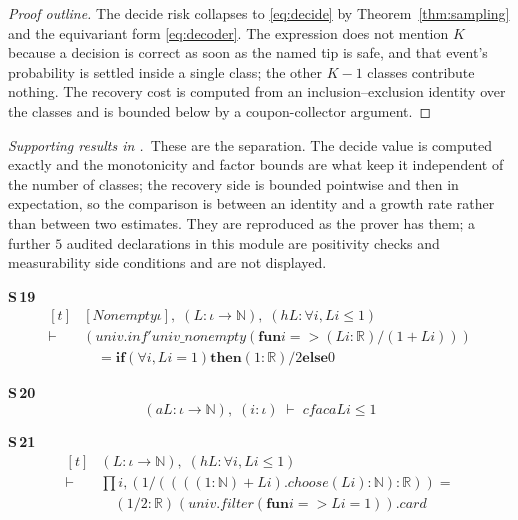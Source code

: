 \begin{proof}[Proof outline]
The decide risk collapses to \eqref{eq:decide} by Theorem~\ref{thm:sampling} and the
equivariant form \eqref{eq:decoder}. The expression does not mention $K$ because a decision is
correct as soon as the named tip is safe, and that event's probability is settled inside a
single class; the other $K-1$ classes contribute nothing. The recovery cost is computed from
an inclusion--exclusion identity over the classes and is bounded below by a coupon-collector
argument.
\end{proof}


\noindent\emph{Supporting results in .}~These are the separation. The decide value is computed exactly and the monotonicity and factor bounds are what keep it independent of the number of classes; the recovery side is bounded pointwise and then in expectation, so the comparison is between an identity and a growth rate rather than between two estimates. They are reproduced as the prover has them; a further $5$ audited declarations in this module are positivity checks and measurability side conditions and are not displayed.

\noindent\textbf{S\,19}\quad{}
{\footnotesize\[ \begin{aligned}[t]
&[\mathit{Nonempty} \iota ],\; (\mathit{L} : \iota \to \mathbb{N} ),\; (\mathit{hL} : \forall \mathit{i}, \mathit{L} \mathit{i} \leq 1)\\
\vdash\;&(\mathit{univ}.\mathit{inf'} \mathit{univ\_nonempty} (\mathbf{fun} \mathit{i} => (\mathit{L} \mathit{i} : \mathbb{R} ) / (1 + \mathit{L} \mathit{i})))\\
&\quad = \mathbf{if} (\forall \mathit{i}, \mathit{L} \mathit{i} = 1) \mathbf{then} (1 : \mathbb{R} ) / 2 \mathbf{else} 0
\end{aligned} \]}

\noindent\textbf{S\,20}\quad{}
{\footnotesize\[ (\mathit{a} \mathit{L} : \iota \to \mathbb{N} ),\; (\mathit{i} : \iota ) \;\vdash\; \mathit{cfac} \mathit{a} \mathit{L} \mathit{i} \leq 1 \]}

\noindent\textbf{S\,21}\quad{}
{\footnotesize\[ \begin{aligned}[t]
&(\mathit{L} : \iota \to \mathbb{N} ),\; (\mathit{hL} : \forall \mathit{i}, \mathit{L} \mathit{i} \leq 1)\\
\vdash\;&\textstyle\prod \mathit{i}, (1 / ((((1:\mathbb{N} ) + \mathit{L} \mathit{i}).\mathit{choose} (\mathit{L} \mathit{i}) : \mathbb{N} ) : \mathbb{R} )) =\\
&\quad (1 / 2 : \mathbb{R} ) ^{} (\mathit{univ}.\mathit{filter} (\mathbf{fun} \mathit{i} => \mathit{L} \mathit{i} = 1)).\mathit{card}
\end{aligned} \]}

